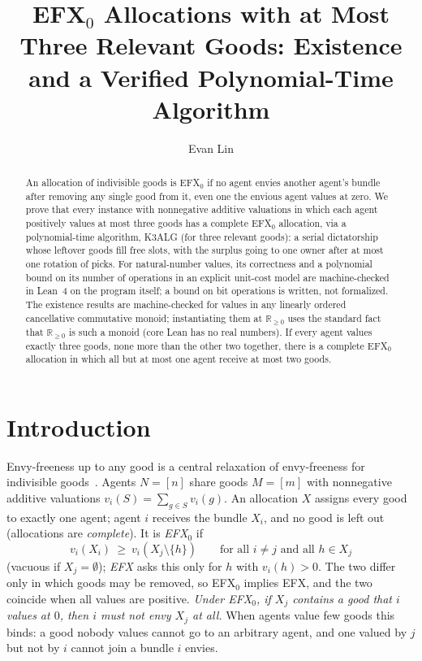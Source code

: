 \documentclass[runningheads,11pt]{llncs}
\newcommand{\efxz}{\texorpdfstring{\mbox{EFX$_0$}}{EFX0}}
\begin{document}
\title{\efxz{} Allocations with at Most Three Relevant Goods: Existence and a Verified Polynomial-Time Algorithm}
\titlerunning{\efxz{} with at Most Three Relevant Goods}

\author{Evan Lin}

\maketitle

\begin{abstract}
An allocation of indivisible goods is \efxz{} if no agent envies another agent's bundle after removing any single good from it, even one the envious agent values at zero. We prove that every instance with nonnegative additive valuations in which each agent positively values at most three goods has a complete \efxz{} allocation, via a polynomial-time algorithm, K3ALG (for three relevant goods): a serial dictatorship whose leftover goods fill free slots, with the surplus going to one owner after at most one rotation of picks. For natural-number values, its correctness and a polynomial bound on its number of operations in an explicit unit-cost model are machine-checked in Lean~4 on the program itself; a bound on bit operations is written, not formalized. The existence results are machine-checked for values in any linearly ordered cancellative commutative monoid; instantiating them at $\mathbb{R}_{\ge0}$ uses the standard fact that $\mathbb{R}_{\ge0}$ is such a monoid (core Lean has no real numbers). If every agent values exactly three goods, none more than the other two together, there is a complete \efxz{} allocation in which all but at most one agent receive at most two goods.
\end{abstract}

\section{Introduction}

Envy-freeness up to any good is a central relaxation of envy-freeness for indivisible goods~\cite{AmanatidisBFV22}. Agents $N=[n]$ share goods $M=[m]$ with nonnegative additive valuations $v_i(S)=\sum_{g\in S}v_i(g)$. An allocation $X$ assigns every good to exactly one agent; agent $i$ receives the bundle $X_i$, and no good is left out (allocations are \emph{complete}). It is \emph{\efxz{}} if
\[
  v_i(X_i)\ \ge\ v_i(X_j\setminus\{h\})\qquad\text{for all } i\ne j \text{ and all } h\in X_j
\]
(vacuous if $X_j=\emptyset$); \emph{EFX} asks this only for $h$ with $v_i(h)>0$. The two differ only in which goods may be removed, so \efxz{} implies EFX, and the two coincide when all values are positive. \emph{Under \efxz{}, if $X_j$ contains a good that $i$ values at $0$, then $i$ must not envy $X_j$ at all.} When agents value few goods this binds: a good nobody values cannot go to an arbitrary agent, and one valued by $j$ but not by $i$ cannot join a bundle $i$ envies.
\end{document}
